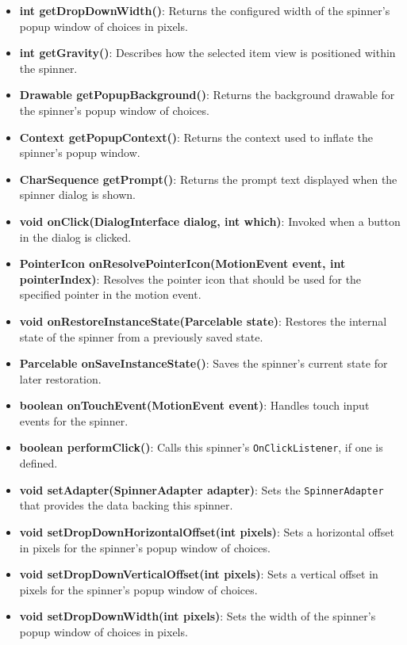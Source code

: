 \documentclass{report}
\begin{document}
\begin{itemize}
\begin{itemize}
                \item \textbf{int getDropDownWidth()}: Returns the configured width of the spinner’s popup window of choices in pixels.
                \item \textbf{int getGravity()}: Describes how the selected item view is positioned within the spinner.
                \item \textbf{Drawable getPopupBackground()}: Returns the background drawable for the spinner’s popup window of choices.
                \item \textbf{Context getPopupContext()}: Returns the context used to inflate the spinner’s popup window.
                \item \textbf{CharSequence getPrompt()}: Returns the prompt text displayed when the spinner dialog is shown.
                \item \textbf{void onClick(DialogInterface dialog, int which)}: Invoked when a button in the dialog is clicked.
                \item \textbf{PointerIcon onResolvePointerIcon(MotionEvent event, int pointerIndex)}: Resolves the pointer icon that should be used for the specified pointer in the motion event.
                \item \textbf{void onRestoreInstanceState(Parcelable state)}: Restores the internal state of the spinner from a previously saved state.
                \item \textbf{Parcelable onSaveInstanceState()}: Saves the spinner’s current state for later restoration.
                \item \textbf{boolean onTouchEvent(MotionEvent event)}: Handles touch input events for the spinner.
                \item \textbf{boolean performClick()}: Calls this spinner’s \texttt{OnClickListener}, if one is defined.
                \item \textbf{void setAdapter(SpinnerAdapter adapter)}: Sets the \texttt{SpinnerAdapter} that provides the data backing this spinner.
                \item \textbf{void setDropDownHorizontalOffset(int pixels)}: Sets a horizontal offset in pixels for the spinner’s popup window of choices.
                \item \textbf{void setDropDownVerticalOffset(int pixels)}: Sets a vertical offset in pixels for the spinner’s popup window of choices.
                \item \textbf{void setDropDownWidth(int pixels)}: Sets the width of the spinner’s popup window of choices in pixels.

\end{itemize}
\end{itemize}
\end{document}
